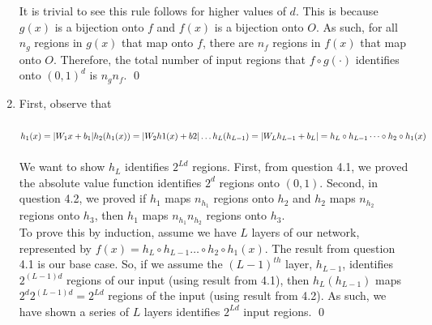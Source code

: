 \documentclass[11pt,english]{article}
\begin{document}
\begin{enumerate}
	It is trivial to see this rule follows for higher values of $d$. This is because $g(x)$ is a bijection onto $f$ and $f(x)$ is a bijection onto $O$. As such, for all $n_g$ regions in $g(x)$ that map onto $f$, there are $n_f$ regions in $f(x)$ that map onto $O$. Therefore, the total number of input regions that $f \circ g(\cdot)$ identifies onto $(0, 1)^d$ is $n_gn_f$. \qed \pagebreak
	\item First, observe that\\\\
	 $h_1(x) = |W_1x + b_1| \\
	 h_2(h_1(x)) = |W_2h1(x) + b2| \\
	 \dots \\
	 h_L(h_{L-1}) = |W_Lh_{L-1} + b_L| = h_L \circ h_{L-1} \dots \circ h_2 \circ h_1(x)$ \\\\
	 We want to show $h_L$ identifies $2^{Ld}$ regions. First, from question 4.1, we proved the absolute value function identifies $2^d$ regions onto $(0, 1)$. Second, in question 4.2, we proved if $h_1$ maps $n_{h_1}$ regions onto $h_2$ and $h_2$ maps $n_{h_2}$ regions onto $h_3$, then $h_1$ maps $n_{h_1}n_{h_2}$ regions onto $h_3$. \\
	 To prove this by induction, assume we have $L$ layers of our network, represented by $f(x) = h_L \circ h_{L-1} \dots \circ h_2 \circ h_1(x)$. The result from question 4.1 is our base case. So, if we assume the $(L-1)^{th}$ layer, $h_{L-1}$, identifies $2^{(L-1)d}$ regions of our input (using result from 4.1), then $h_L(h_{L-1})$ maps $2^d 2^{(L-1)d} = 2^{Ld}$ regions of the input (using result from 4.2). As such, we have shown a series of $L$ layers identifies $2^{Ld}$ input regions. \qed
\end{enumerate}
\end{document}
